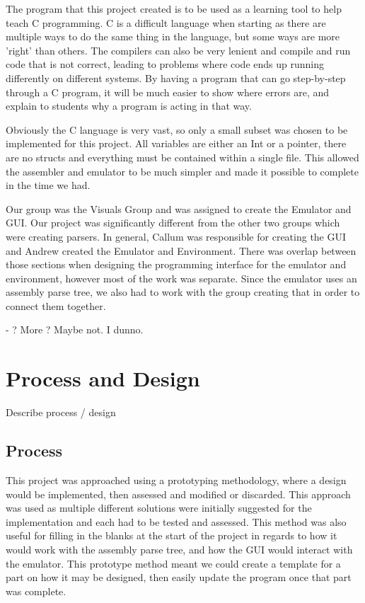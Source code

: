 \documentclass[10point]{article}
\begin{document}
The program that this project created is to be used as a learning tool to help teach C programming. C is a difficult language when starting as there are multiple ways to do the same thing in the language, but some ways are more 'right' than others. The compilers can also be very lenient and compile and run code that is not correct, leading to problems where code ends up running differently on different systems. By having a program that can go step-by-step through a C program, it will be much easier to show where errors are, and explain to students why a program is acting in that way.

Obviously the C language is very vast, so only a small subset was chosen to be implemented for this project. All variables are either an Int or a pointer, there are no structs and everything must be contained within a single file. This allowed the assembler and emulator to be much simpler and made it possible to complete in the time we had.

Our group was the Visuals Group and was assigned to create the Emulator and GUI. Our project was significantly different from the other two groups which were creating parsers. In general, Callum was responsible for creating the GUI and Andrew created the Emulator and Environment. There was overlap between those sections when designing the programming interface for the emulator and environment, however most of the work was separate. Since the emulator uses an assembly parse tree, we also had to work with the group creating that in order to connect them together.

- ? More ? Maybe not. I dunno.

\section{Process and Design}
Describe process / design

\subsection{Process}
This project was approached using a prototyping methodology, where a design would be implemented, then assessed and modified or discarded. This approach was used as multiple different solutions were initially suggested for the implementation and each had to be tested and assessed. This method was also useful for filling in the blanks at the start of the project in regards to how it would work with the assembly parse tree, and how the GUI would interact with the emulator. This prototype method meant we could create a template for a part on how it may be designed, then easily update the program once that part was complete.
\end{document}
